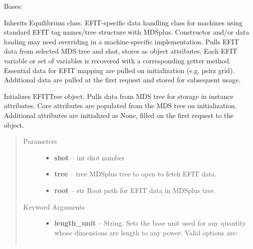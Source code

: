 \documentclass[letterpaper,10pt,english]{sphinxmanual}
\begin{document}
\begin{fulllineitems}
\label{eqtools:eqtools.EFIT.EFITTree}
Bases: {\hyperref[eqtools:eqtools.core.Equilibrium]{}}

Inherits Equilibrium class. EFIT-specific data handling class for machines using
standard EFIT tag names/tree structure with MDSplus. Constructor and/or data loading may
need overriding in a machine-specific implementation.
Pulls EFIT data from selected MDS tree and shot, stores as object attributes.
Each EFIT variable or set of variables is recovered with a corresponding getter method.
Essential data for EFIT mapping are pulled on initialization (e.g. psirz grid).
Additional data are pulled at the first request and stored for subsequent usage.

Intializes EFITTree object. Pulls data from MDS tree for storage in
instance attributes. Core attributes are populated from the MDS tree
on initialization. Additional attributes are initialized as None,
filled on the first request to the object.
\begin{quote}\begin{description}
\item[{Parameters }] \leavevmode\begin{itemize}
\item {} 
\textbf{shot} --
int
shot number

\item {} 
\textbf{tree} --
tree
MDSplus tree to open to fetch EFIT data.

\item {} 
\textbf{root} --
str
Root path for EFIT data in MDSplus tree.

\end{itemize}

\item[{Keyword Arguments}] \leavevmode\begin{itemize}
\item {} 
\textbf{length\_unit} --
String.
Sets the base unit used for any quantity whose
dimensions are length to any power. Valid options are:
\begin{quote}

\begin{tabulary}{\linewidth}{|L|L|}
\hline


\end{tabulary}
\end{quote}
\end{itemize}
\end{description}
\end{quote}
\end{fulllineitems}
\end{document}
